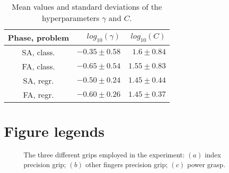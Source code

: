\documentclass[10pt]{bmc_article}
\def\texttt{[image: ]}
\newenvironment{bmcformat}
  {\begin{raggedright}\baselineskip20pt\sloppy\setboolean{publ}{false}}
  {\end{raggedright}\baselineskip20pt\sloppy}
\begin{document}
\begin{bmcformat}
\begin{table}[!ht] \centering
  \caption{Mean values and standard deviations of the hyperparameters $\gamma$ and $C$.}
  \begin{tabular}{|c|r|r|}
    \hline
    Phase, problem & $log_{10}(\gamma)$ & $log_{10}(C)$ \\
    \hline
    SA, class.     & $-0.35 \pm 0.58$   & $1.6  \pm 0.84$ \\
    FA, class.     & $-0.65 \pm 0.54$   & $1.55 \pm 0.83$ \\
    SA, regr.      & $-0.50 \pm 0.24$   & $1.45 \pm 0.44$ \\
    FA, regr.      & $-0.60 \pm 0.26$   & $1.45 \pm 0.37$ \\
    \hline
  \end{tabular}
  \label{tab:hyp}
\end{table}

\section*{Figure legends}


\begin{figure}[!t] \centering
  \caption{The three different grips employed in the experiment: $(a)$
   index precision grip; $(b)$ other fingers precision grip; $(c)$
   power grasp.}
  \label{fig:Grasps}
\end{figure}


\end{bmcformat}
\end{document}
